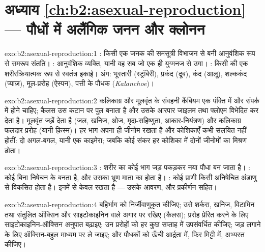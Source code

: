 \section*{अध्याय \ref{ch:b2:asexual-reproduction} --- पौधों में अलैंगिक जनन और क्लोनन}

\begin{solution}{exo:b2:asexual-reproduction:1}
: किसी एक जनक की समसूत्री विभाजन से बनी आनुवंशिक रूप से समरूप
संतति। : आनुवंशिक व्यक्ति, यानी वह सब जो एक ही
युग्मनज से उगा। : किसी  की एक शरीरक्रियात्मक रूप से स्वतंत्र इकाई।
अंग: भूस्तारी (स्ट्रॉबेरी), प्रकंद (दूब), कंद
(आलू), शल्ककंद (प्याज़), मूल-प्ररोह (ऐस्पन), पत्ती के पौधक
(\emph{Kalanchoe})।
\end{solution}

\begin{solution}{exo:b2:asexual-reproduction:2}
कलिकाग्र और मूलवृंत के संवहनी कैंबियम एक पंक्ति में और संपर्क में होने
चाहिए; कैलस उस कटान पर पुल बनाता है और उसके आरपार जाइलम तथा फ्लोएम
विभेदित कर देता है। मूलवृंत जड़ें देता है (जल, खनिज, ओज,
मृदा-सहिष्णुता, आकार-नियंत्रण) और कलिकाग्र फलदार प्ररोह (यानी
क़िस्म)। हर भाग अपना ही जीनोम रखता है और कोशिकाएँ कभी संलयित नहीं होतीं:
दो  अगल-बगल, यानी एक काइमेरा; जबकि कोई संकर हर कोशिका में
दोनों जीनोमों का मिश्रण ढोता।
\end{solution}

\begin{solution}{exo:b2:asexual-reproduction:3}
: शरीर का कोई भाग जड़ पकड़कर नया पौधा बन जाता है।
: कोई  बिना निषेचन के बनता है, और उसका भ्रूण माता का
 होता है। : कोई प्राणी किसी अनिषेचित
अंडाणु से विकसित होता है। इनमें से केवल   रखता है --- उसके
आवरण,  और प्रकीर्णन सहित।
\end{solution}

\begin{solution}{exo:b2:asexual-reproduction:4}
बहिर्भाग को निर्जीवाणुकृत कीजिए; उसे शर्करा, खनिज,
विटामिन तथा संतुलित ऑक्सिन और साइटोकाइनिन वाले अगार पर रखिए (कैलस);
प्ररोह प्रेरित करने के लिए साइटोकाइनिन-ऑक्सिन अनुपात बढ़ाइए; उन प्ररोहों
को हर कुछ सप्ताह में उपसंवर्धित कीजिए; जड़ लगाने के लिए ऑक्सिन-बहुल
माध्यम पर ले जाइए; और पौधकों को ऊँची आर्द्रता में, फिर मिट्टी में,
अभ्यस्त कीजिए।
\end{solution}

